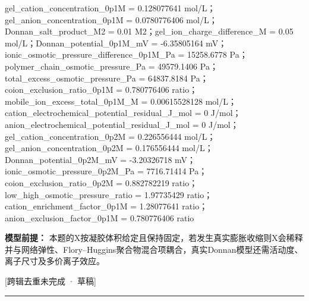 \documentclass[UTF8,11pt,a4paper]{ctexart}
\begin{document}
gel\_cation\_concentration\_0p1M = 0.128077641 mol/L；gel\_anion\_concentration\_0p1M = 0.0780776406 mol/L；Donnan\_salt\_product\_M2 = 0.01 M2；gel\_ion\_charge\_difference\_M = 0.05 mol/L；Donnan\_potential\_0p1M\_mV = -6.35805164 mV；ionic\_osmotic\_pressure\_difference\_0p1M\_Pa = 15258.6778 Pa；polymer\_chain\_osmotic\_pressure\_Pa = 49579.1406 Pa；total\_excess\_osmotic\_pressure\_Pa = 64837.8184 Pa；coion\_exclusion\_ratio\_0p1M = 0.780776406 ratio；mobile\_ion\_excess\_total\_0p1M\_M = 0.00615528128 mol/L；cation\_electrochemical\_potential\_residual\_J\_mol = 0 J/mol；anion\_electrochemical\_potential\_residual\_J\_mol = 0 J/mol；gel\_cation\_concentration\_0p2M = 0.226556444 mol/L；gel\_anion\_concentration\_0p2M = 0.176556444 mol/L；Donnan\_potential\_0p2M\_mV = -3.20326718 mV；ionic\_osmotic\_pressure\_0p2M\_Pa = 7716.71414 Pa；coion\_exclusion\_ratio\_0p2M = 0.882782219 ratio；low\_high\_osmotic\_pressure\_ratio = 1.97735429 ratio；cation\_enrichment\_factor\_0p1M = 1.28077641 ratio；anion\_exclusion\_factor\_0p1M = 0.780776406 ratio\par
\noindent\textbf{模型前提：}
本题的X按凝胶体积给定且保持固定，若发生真实膨胀收缩则X会稀释并与网络弹性、Flory–Huggins聚合物混合项耦合，真实Donnan模型还需活动度、离子尺寸及多价离子效应。\par
\noindent\textcolor{red!65!black}{[跨辑去重未完成 · 草稿]} \par
\medskip\hrule\medskip
{}
\end{document}
